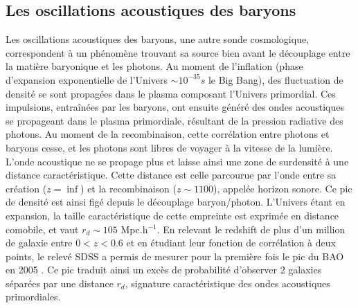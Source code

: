 \documentclass[../main/main.tex]{subfiles}
\begin{document}
\subsection{Les oscillations acoustiques des baryons}

Les oscillations acoustiques des baryons, une autre sonde cosmologique,
correspondent à un phénomène trouvant sa source bien avant le découplage entre la
matière baryonique et les photons. Au moment de l'inflation (phase
d'expansion exponentielle de l'Univers $\sim10^{-35}s$ le Big Bang), des
fluctuation de densité se sont propagées dans le plasma composant l'Univers
primordial. Ces impulsions, entraînées par les baryons, ont ensuite
généré des ondes acoustiques se propageant dans le plasma
primordiale, résultant de la pression radiative des photons. Au moment
de la recombinaison, cette corrélation entre photons et baryons cesse,
et les photons sont libres de voyager à la vitesse de la lumière. L'onde acoustique ne se
propage plus et laisse ainsi une zone de surdensité à une distance
caractéristique. Cette distance est celle 
parcourue par l'onde entre sa création ($z=\inf$) et la
recombinaison ($z\sim1100$), appelée horizon sonore. Ce pic de densité est ainsi figé
depuis le découplage baryon/photon. L'Univers étant en expansion, la
taille caractéristique de cette empreinte est exprimée en distance
comobile, et vaut $r_{d}\sim105$ Mpc.h$^{-1}$.
En relevant le redshift de plus d'un million de galaxie entre $0<z<0.6$
et en étudiant leur fonction de corrélation à deux points,
le relevé SDSS \citep{YorkSDSS2000} a permis de mesurer pour la première fois le pic du BAO
en 2005 \citep[Figure~\ref{fig:baopeak};][]{Eisenstein}. Ce pic traduit ainsi un excès de probabilité d'observer 2 galaxies
séparées par une distance $r_{d}$, signature caractéristique des ondes
acoustiques primordiales. 
\end{document}
